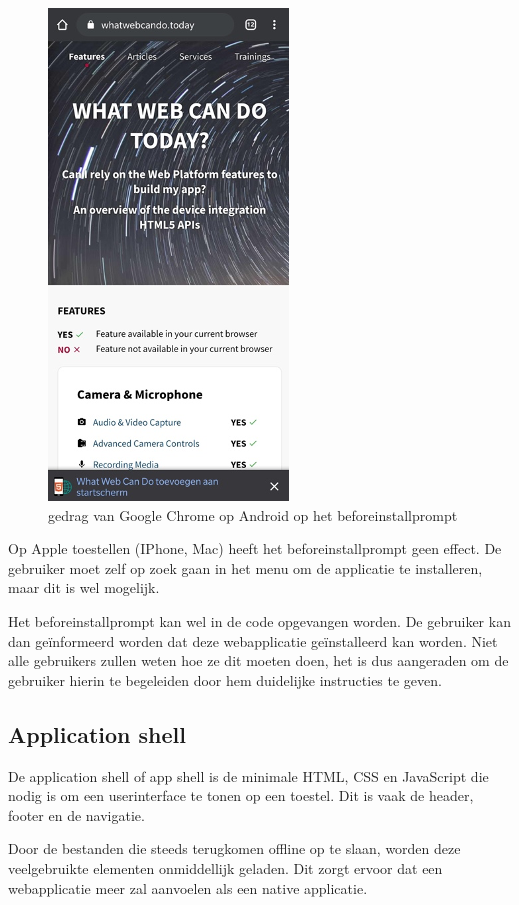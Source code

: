 	\begin{figure}[!htb]
		\centering
		\includegraphics{./img/beforeinstallprompt_android.png}
		\caption{gedrag van Google Chrome op Android op het beforeinstallprompt}
	\end{figure}
	
	Op Apple toestellen (IPhone, Mac) heeft het beforeinstallprompt geen effect. De gebruiker moet zelf op zoek gaan in het menu om de applicatie te installeren, maar dit is wel mogelijk.
	
	Het beforeinstallprompt kan wel in de code opgevangen worden. De  gebruiker kan dan geïnformeerd worden dat deze webapplicatie geïnstalleerd kan worden. 
	Niet alle gebruikers zullen weten hoe ze dit moeten doen, het is dus aangeraden om de gebruiker hierin te begeleiden door hem duidelijke instructies te geven.
	\autocite{PWAbuilder2020}


\subsection{Application shell}
	De application shell of app shell is de minimale HTML, CSS en JavaScript die nodig is om een userinterface te tonen op een toestel. Dit is vaak de header, footer en de navigatie.
	
	Door de bestanden die steeds terugkomen offline op te slaan, worden deze veelgebruikte elementen onmiddellijk geladen. Dit zorgt ervoor dat een webapplicatie meer zal aanvoelen als een native applicatie.
	
